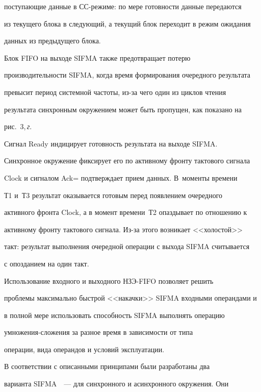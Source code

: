 поступающие данные в СС-ре\-жи\-ме: по мере готовности данные передаются

из текущего блока в следующий, а текущий блок переходит в режим ожидания

данных из предыдущего блока.



      Блок FIFO на выходе SIFMA также предотвращает потерю

производитель\-ности SIFMA, когда время формирования очередного результата

превысит период системной частоты, из-за чего один из циклов чтения

результата синхронным окружением может быть пропущен, как показано на

рис.~3,\,\textit{г}.



      Сигнал Ready индицирует готовность результата на выходе SIFMA.

Синхронное окружение фиксирует его по активному фронту тактового сигнала

Clock и сигналом Ack\;= подтверждает прием данных. В~моменты времени

Т1 и~Т3 результат оказывается готовым перед появлением очередного

активного фронта Clock, а в момент времени~Т2 опаздывает по отношению к

активному фронту тактового сигнала. Из-за этого возникает <<холостой>>

такт: результат выполнения очередной операции с выхода SIFMA считывается

с опозданием на один такт.

{



}



      Использование входного и выходного НЗЭ-FIFO позволяет решить

проблемы максимально быстрой <<накачки>> SIFMA входными операндами и

в полной мере использовать способность SIFMA выполнять операцию

      умно\-же\-ния-сло\-же\-ния за разное время в зависимости от типа

операции, вида операндов и условий эксплуатации.



      В соответствии с описанными принципами были разработаны два

варианта SIFMA~\cite{18-st1}~--- для синхронного и асинхронного окружения. Они

